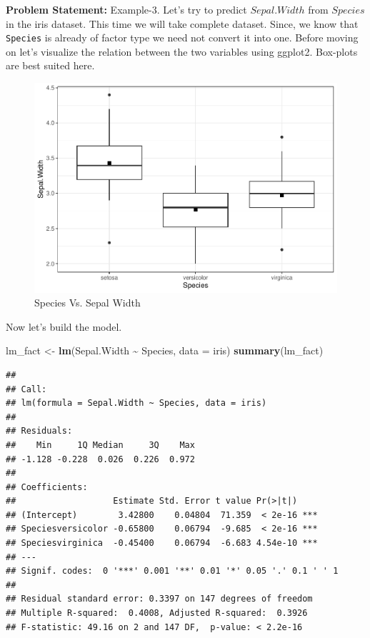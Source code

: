 \documentclass[
]{book}
\newenvironment{Shaded}{\begin{snugshade}}{\end{snugshade}}
\newcommand{\AttributeTok}[1]{\textcolor[rgb]{0.13,0.29,0.53}{#1}}
\newcommand{\FunctionTok}[1]{\textcolor[rgb]{0.13,0.29,0.53}{\textbf{#1}}}
\newcommand{\NormalTok}[1]{#1}
\newcommand{\OtherTok}[1]{\textcolor[rgb]{0.56,0.35,0.01}{#1}}
\newcommand{\SpecialCharTok}[1]{\textcolor[rgb]{0.81,0.36,0.00}{\textbf{#1}}}
\begin{document}
\textbf{Problem Statement:} Example-3. Let's try to predict \({Sepal.Width}\) from \({Species}\) in the iris dataset. This time we will take complete dataset. Since, we know that \texttt{Species} is already of factor type we need not convert it into one. Before moving on let's visualize the relation between the two variables using ggplot2. Box-plots are best suited here.

\begin{figure}

{\centering \includegraphics[height=0.3\textheight]{DauR_files/figure-latex/fact1-1} 

}

\caption{Species Vs. Sepal Width}\label{fig:fact1}
\end{figure}

Now let's build the model.

\begin{Shaded}
\begin{Highlighting}[]
\NormalTok{lm\_fact }\OtherTok{\textless{}{-}} \FunctionTok{lm}\NormalTok{(Sepal.Width }\SpecialCharTok{\textasciitilde{}}\NormalTok{ Species, }\AttributeTok{data =}\NormalTok{ iris)}
\FunctionTok{summary}\NormalTok{(lm\_fact)}
\end{Highlighting}
\end{Shaded}

\begin{verbatim}
## 
## Call:
## lm(formula = Sepal.Width ~ Species, data = iris)
## 
## Residuals:
##    Min     1Q Median     3Q    Max 
## -1.128 -0.228  0.026  0.226  0.972 
## 
## Coefficients:
##                   Estimate Std. Error t value Pr(>|t|)    
## (Intercept)        3.42800    0.04804  71.359  < 2e-16 ***
## Speciesversicolor -0.65800    0.06794  -9.685  < 2e-16 ***
## Speciesvirginica  -0.45400    0.06794  -6.683 4.54e-10 ***
## ---
## Signif. codes:  0 '***' 0.001 '**' 0.01 '*' 0.05 '.' 0.1 ' ' 1
## 
## Residual standard error: 0.3397 on 147 degrees of freedom
## Multiple R-squared:  0.4008, Adjusted R-squared:  0.3926 
## F-statistic: 49.16 on 2 and 147 DF,  p-value: < 2.2e-16
\end{verbatim}
\end{document}
